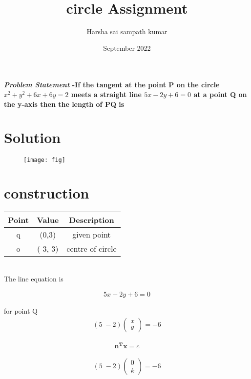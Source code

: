 \documentclass[journal,10pt,twocolumn]{article}
\title{\textbf{circle Assignment}}
\author{Harsha sai sampath kumar}
\date{September 2022}
\let\vec\mathbf
\newcommand{\myvec}[1]{\ensuremath{\begin{pmatrix}#1\end{pmatrix}}}
\begin{document}
\maketitle
\paragraph{\textit{\large Problem Statement} -If the tangent at the point P  on the circle $x^2+y^2+6x+6y=2$ meets a straight line $5x-2y+6=0$         at a point Q on the y-axis then the length of PQ is }

\section*{\large Solution}

\begin{figure}[H]
\centering
\texttt{[image: fig]}
\caption{}
\end{figure}

\section{construction}


\begin{tabular}{|c|c|c|}
	\hline
	\textbf{Point}&\textbf{Value}&\textbf{Description}\\
	\hline
	q&(0,3)&  given point\\
	\hline
	o&(-3,-3)& centre of circle\\
	\hline
	
	
	
\end{tabular}\\







The line equation is


\begin{align}
5x-2y+6=0
\end{align}

for point Q
\begin{eqnarray}
{(5 \;-2)}
\myvec{x\\y}=-6
\end{eqnarray}


\begin{eqnarray}
\vec{n^Tx}=c
\end{eqnarray}

\begin{eqnarray}
{(5 \;-2)}
\myvec{0\\k}=-6
\end{eqnarray}
\end{document}

